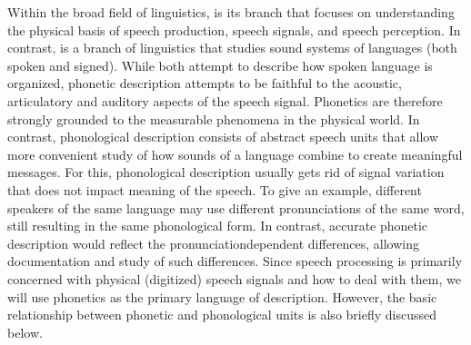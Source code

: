 \documentclass[letterpaper,10pt,english]{jupyterBook}
\begin{document}
\sphinxAtStartPar
Within the broad field of linguistics,  is its branch that
focuses on understanding the physical basis of speech production, speech
signals, and speech perception. In contrast,  is a branch of
linguistics that studies sound systems of languages (both spoken and
signed). While both attempt to describe how spoken language is
organized, phonetic description attempts to be faithful to the acoustic,
articulatory and auditory aspects of the speech signal. Phonetics are
therefore strongly grounded to the measurable phenomena in the physical
world. In contrast, phonological description consists of abstract speech
units that allow more convenient study of how sounds of a language
combine to create meaningful messages. For this, phonological
description usually gets rid of signal variation that does not impact
meaning of the speech. To give an example, different speakers of the
same language may use different pronunciations of the same word, still
resulting in the same phonological form. In contrast, accurate phonetic
description would reflect the pronunciation\sphinxhyphen{}dependent differences,
allowing documentation and study of such differences. Since speech
processing is primarily concerned with physical (digitized) speech
signals and how to deal with them, we will use phonetics as the primary
language of description. However, the basic relationship between
phonetic and phonological units is also briefly discussed below.
\end{document}
